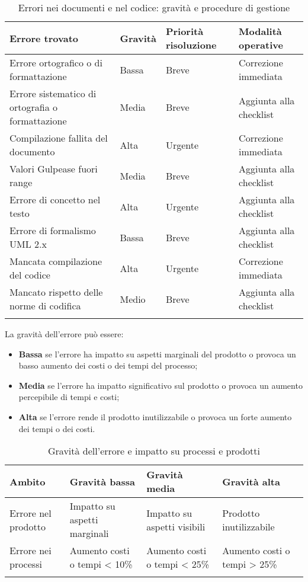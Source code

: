 {\begin{longtable}[c]{|>{\centering\arraybackslash}m{6cm} | >{\centering\arraybackslash}m{3cm} | >{\centering\arraybackslash}m{3cm} | >{\centering\arraybackslash}m{3cm} |}
 \hline
 \textbf{Errore trovato} & \textbf{Gravità} & \textbf{Priorità risoluzione} & \textbf{Modalità operative}\\
 \hline
 Errore ortografico o di formattazione & Bassa & Breve & Correzione immediata\\
 \hline
 Errore sistematico di ortografia o formattazione & Media & Breve & Aggiunta alla checklist\\
 \hline
 Compilazione fallita del documento & Alta & Urgente & Correzione immediata\\ 
 \hline
 Valori Gulpease fuori range & Media & Breve & Aggiunta alla checklist\\
 \hline
 Errore di concetto nel testo & Alta & Urgente & Aggiunta alla checklist\\
 \hline
 Errore di formalismo  UML  2.x & Bassa & Breve & Aggiunta alla checklist\\
 \hline
 Mancata compilazione del codice & Alta & Urgente & Correzione immediata\\ 
 \hline
 Mancato rispetto delle norme di codifica & Medio & Breve & Aggiunta alla checklist\\
 \hline
		\caption{Errori nei documenti e nel codice: gravità e procedure di gestione \label{tab:ErroriDocumentiCodice}}\\
\end{longtable}

La gravità dell’errore può essere:
\begin{itemize}
\item \textbf{Bassa} se l’errore ha impatto su aspetti marginali del prodotto o provoca un basso aumento dei costi o dei tempi del processo;
\item \textbf{Media} se l’errore ha impatto significativo sul prodotto o provoca un aumento percepibile di tempi e costi;
\item \textbf{Alta} se l’errore rende il prodotto inutilizzabile o provoca un forte aumento dei tempi o dei costi.
\end{itemize}

\begin{longtable}[c]{|>{\centering\arraybackslash}m{6cm} | >{\centering\arraybackslash}m{3cm} | >{\centering\arraybackslash}m{3cm} | >{\centering\arraybackslash}m{3cm} |}
 
 \hline
 \textbf{Ambito} & \textbf{Gravità bassa} & \textbf{Gravità media} & \textbf{Gravità alta}\\
 \hline
 Errore nel prodotto & Impatto su aspetti marginali & Impatto su aspetti visibili & Prodotto inutilizzabile\\
 \hline
 Errore nei processi & Aumento costi o tempi < 10\% & Aumento costi o tempi < 25\% & Aumento costi o tempi > 25\%\\
 \hline
		\caption{Gravità dell’errore e impatto su processi e prodotti \label{tab:GravitaErrori}}\\
\end{longtable}

}
